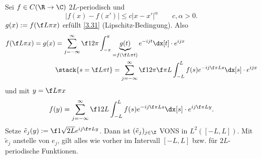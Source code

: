 \begin{nt} \label{3.35}
	Sei $f \in C(\R \to \C)$ $2L$-periodisch und
	\[
		|f(x) - f(x')| \le c |x-x'|^\alpha \qquad c,\alpha > 0.
	\]
	$g(x) := f(\f L\pi x)$ erfüllt \ref{3.31} (Lipschitz-Bedingung).
	Also
	\begin{align*}
		f(\f L\pi x) = g(x) 
		&= \sum_{j=-\infty}^\infty \f 1{2\pi} \int_{-\pi}^\pi \underbrace{g(t)}_{=f(\f L\pi t)} e^{-ijt} \dx[t] \cdot e^{ijx} \\
		&\stack{s = \f L\pi t}= \sum_{j=-\infty}^\infty \f 1{2\pi} \f \pi L \int_{-L}^L f(s) e^{-ij \f \pi L s} \dx[s] \cdot e^{ijx}
	\end{align*}
	und mit $y = \f L \pi x$
	\[
		f(y) = \sum_{j=-\infty}^\infty \f 1{2L} \int_{-L}^L f(s) e^{-ij\f \pi L s} \dx[s] \cdot e^{ij \f \pi L y}.
	\]
	Setze $\tilde e_j(y) := \f 1{\sqrt{2L}} e^{ij \f \pi L y}$.
	Dann ist $(\tilde e_j)_{j\in \Z}$ VONS in $L^2([-L,L])$.
	Mit $\tilde e_j$ anstelle von $e_j$, gilt alles wie vorher im Intervall $[-L,L]$ bzw. für $2L$-periodische Funktionen.
\end{nt}


